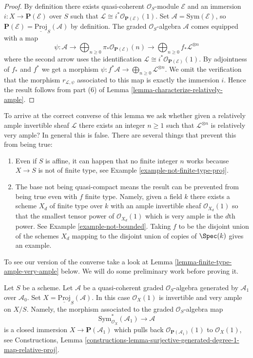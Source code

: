 \begin{proof}
By definition there exists quasi-coherent $\mathcal{O}_S$-module
$\mathcal{E}$ and an immersion $i : X \to \mathbf{P}(\mathcal{E})$
over $S$ such that
$\mathcal{L} \cong i^*\mathcal{O}_{\mathbf{P}(\mathcal{E})}(1)$.
Set $\mathcal{A} = \text{Sym}(\mathcal{E})$, so
$\mathbf{P}(\mathcal{E}) = \underline{\text{Proj}}_S(\mathcal{A})$
by definition. The graded $\mathcal{O}_S$-algebra $\mathcal{A}$
comes equipped with a map
$$
\psi :
\mathcal{A} \to
\bigoplus\nolimits_{n \geq 0}
\pi_*\mathcal{O}_{\mathbf{P}(\mathcal{E})}(n) \to
\bigoplus\nolimits_{n \geq 0}
f_*\mathcal{L}^{\otimes n}
$$
where the second arrow uses the identification
$\mathcal{L} \cong i^*\mathcal{O}_{\mathbf{P}(\mathcal{E})}(1)$.
By adjointness of $f_*$ and $f^*$ we get a morphism
$\psi : f^*\mathcal{A} \to \bigoplus_{n \geq 0}\mathcal{L}^{\otimes n}$.
We omit the verification that the morphism $r_{\mathcal{L}, \psi}$
associated to this map is exactly the immersion $i$.
Hence the result follows from
part (6) of Lemma \ref{lemma-characterize-relatively-ample}.
\end{proof}

\noindent
To arrive at the correct converse of this lemma we ask
whether given a relatively ample
invertible sheaf $\mathcal{L}$ there exists an integer $n \geq 1$ such
that $\mathcal{L}^{\otimes n}$ is relatively very ample? In general this
is false. There are several things that prevent this from being true:
\begin{enumerate}
\item Even if $S$ is affine, it can happen that no finite integer
$n$ works because $X \to S$ is not of finite type, see
Example \ref{example-not-finite-type-proj}.
\item The base not being quasi-compact means the result can be
prevented from being true even with $f$ finite type. Namely, given
a field $k$ there exists a scheme $X_d$ of finite type over $k$ with
an ample invertible sheaf $\mathcal{O}_{X_d}(1)$ so that the smallest
tensor power of $\mathcal{O}_{X_d}(1)$ which is very ample is the $d$th
power. See Example \ref{example-not-bounded}.
Taking $f$ to be the disjoint union of the schemes $X_d$ mapping
to the disjoint union of copies of $\Spec(k)$ gives an example.
\end{enumerate}
To see our version of the converse take a look at
Lemma \ref{lemma-finite-type-ample-very-ample} below.
We will do some preliminary work before proving it.

\begin{example}
\label{example-very-ample}
Let $S$ be a scheme. Let $\mathcal{A}$ be a quasi-coherent graded
$\mathcal{O}_S$-algebra generated by $\mathcal{A}_1$ over $\mathcal{A}_0$.
Set $X = \underline{\text{Proj}}_S(\mathcal{A})$. In this case
$\mathcal{O}_X(1)$ is invertible and very ample on $X/S$. Namely,
the morphism associated to the graded $\mathcal{O}_S$-algebra map
$$
\text{Sym}_{\mathcal{O}_X}^*(\mathcal{A}_1)
\longrightarrow
\mathcal{A}
$$
is a closed immersion $X \to \mathbf{P}(\mathcal{A}_1)$ which pulls back
$\mathcal{O}_{\mathbf{P}(\mathcal{A}_1)}(1)$ to $\mathcal{O}_X(1)$, see
Constructions, Lemma
\ref{constructions-lemma-surjective-generated-degree-1-map-relative-proj}.
\end{example}

